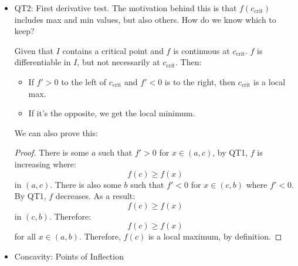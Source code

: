\begin{itemize}
    We can prove the first statement.
    \begin{proof}
        Since $f$ is differentiable, the MVT holds. There is some $c\ in I$ such that:
        \begin{equation}
            f(x_2)-f(x_1)= f'(c)(x_2-x_1) \implies f(x_2)-f(x_1)
            \label{eq:}
        \end{equation}
        which is the definition of an increasing function. The proof goes similarly for the other two.
    \end{proof}
    \item QT2: First derivative test. The motivation behind this is that $f(c_\text{crit})$ includes max and min values, but also others. How do we know which to keep?
    \begin{idea}
        Given that $I$ contains a critical point and $f$ is continuous at $c_\text{crit}$. $f$ is differentiable in $I$, but not necessarily at $c_\text{crit}$. Then:
        \begin{itemize}
            \item If $f'>0$ to the left of $c_\text{crit}$ and $f'<0$ is to the right, then $c_\text{crit}$ is a local max.
            \item If it's the opposite, we get the local minimum.
        \end{itemize}
    \end{idea}
    We can also prove this:
    \begin{proof}
        There is some $a$ such that $f'>0$ for $x \in (a,c)$, by QT1, $f$ is increasing where:
        \begin{equation}
            f(c) \ge f(x)
            \label{eq:}
        \end{equation}
        in $(a,c)$. There is also some $b$ such that $f'<0$ for $x \in (c,b)$ where $f'<0$. By QT1, $f$ decreases. As a result:
        \begin{equation}
            f(c) \ge f(x)
            \label{eq:}
        \end{equation}
        in $(c,b)$. Therefore:
        \begin{equation}
            f(c) \ge f(x)
            \label{eq:}
        \end{equation}
        for all $x\in (a,b)$. Therefore, $f(c)$ is a local maximum, by definition. 
    \end{proof}
    \item Concavity: Points of Inflection
    \begin{definition}

\end{definition}
\end{itemize}
